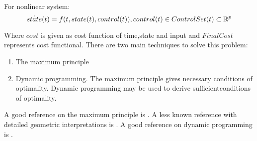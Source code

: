     \noindent For nonlinear system:
    \begin{equation}
        \dot{state}(t) = f(t,state(t),control(t)), control(t) \in ControlSet(t) \subset \mathbb{R}^p
    \end{equation}
    
    Where $cost$ is given as cost function of time,state and input and $FinalCost$ represents cost functional.
    There are two main techniques to solve this problem: 
    
    \begin{enumerate}
        \item The maximum principle
        
        \item Dynamic programming. The maximum principle gives necessary conditions of optimality. Dynamic programming may be used to derive sufficientconditions of optimality.
    \end{enumerate}

    A good reference on the maximum principle is \cite{pontryagin1962ef}. A less known reference with detailed geometric interpretations is \cite{girsanov2012lectures}. A good reference on dynamic programming is \cite{bardi2008optimal}.
    